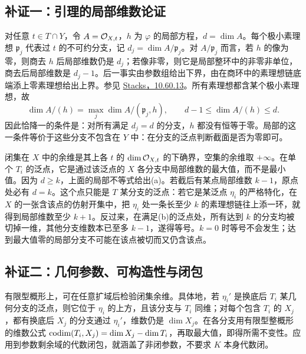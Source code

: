 \subsection*{补证一：引理的局部维数论证}
对任意 $t\in T\cap Y$，令 $A=\mathcal O_{X,t}$，$h$ 为 $\varphi$ 的局部方程，$d=\dim A$。每个极小素理想 $\mathfrak p_j$ 代表过 $t$ 的不可约分支，记 $d_j=\dim A/\mathfrak p_j$。对 $A/\mathfrak p_j$ 而言，若 $h$ 的像为零，则商去 $h$ 后局部维数仍是 $d_j$；若像非零，则它是局部整环中的非零非单位，商去后局部维数是 $d_j-1$。后一事实由参数组给出下界，由在商环中的素理想链底端添上零素理想给出上界。参见 \href{https://stacks.math.columbia.edu/tag/00KW}{Stacks，10.60.13}。所有素理想都含某个极小素理想，故
\[
 \dim A/(h)=\max_j\dim A/(\mathfrak p_j,h),\qquad
 d-1\le \dim A/(h)\le d.
\]
因此恰降一的条件是：对所有满足 $d_j=d$ 的分支，$h$ 都没有恒等于零。局部的这一条件等价于这些分支不包含在 $Y$ 中：在分支的泛点判断截面是否为零即可。

闭集在 $X$ 中的余维是其上各 $t$ 的 $\dim\mathcal O_{X,t}$ 的下确界，空集的余维取 $+\infty$。在单个 $T_i$ 的泛点，它是通过该泛点的 $X$ 各分支中局部维数的最大值，而不是最小值。因为 $d\ge k$，上面的局部不等式给出(a)。若截后有某点局部维数 $k-1$，原点处必有 $d=k$。这个点只能是 $T$ 某分支的泛点：若它是某泛点 $\eta_i$ 的严格特化，在 $X$ 的一张含该点的仿射开集中，把 $\eta_i$ 处一条长至少 $k$ 的素理想链往上添一环，就得到局部维数至少 $k+1$。反过来，在满足(b)的泛点处，所有达到 $k$ 的分支均被切掉一维，其他分支维数本已至多 $k-1$，遂得等号。$k=0$ 时等号不会发生；达到最大值零的局部分支不可能在该点被切而又仍含该点。


\subsection*{补证二：几何参数、可构造性与闭包}
有限型概形上，可在任意扩域后检验闭集余维。具体地，若 $\eta_i'$ 是换底后 $T_i$ 某几何分支的泛点，则它位于 $\eta_i$ 的上方，且该分支与 $T_i$ 同维；对每个包含 $T_i$ 的 $X_j$，都有换底后 $X_j$ 的分支通过 $\eta_i'$，维数仍是 $\dim X_j$。在各分支用有限型整概形的维数公式 $\operatorname{codim}(T_i,X_j)=\dim X_j-\dim T_i$，再取最大值，即得所需不变性。应用到参数剩余域的代数闭包，就涵盖了非闭参数，不要求 $K$ 本身代数闭。

